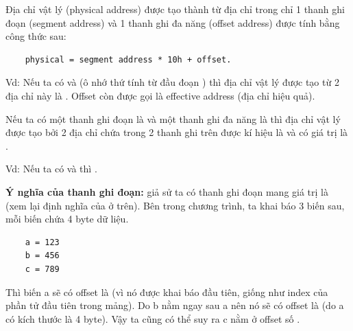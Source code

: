 \documentclass[main.tex]{subfiles}
\begin{document}
\begin{figure}[H]
    \centering
\end{figure}

Địa chỉ vật lý (physical address) được tạo thành từ địa chỉ trong chỉ 1 thanh ghi đoạn (segment address) và 1 thanh ghi đa năng (offset address) được tính bằng công thức sau:

\begin{center}
\begin{verbatim}
    physical = segment address * 10h + offset.
\end{verbatim}
\end{center}

Vd: Nếu ta có  và  (ô nhớ thứ  tính từ đầu đoạn ) thì địa chỉ vật lý được tạo từ 2 địa chỉ này là . Offset còn được gọi là effective address (địa chỉ hiệu quả).\bigskip

Nếu ta có một thanh ghi đoạn là  và một thanh ghi đa năng là  thì địa chỉ vật lý được tạo bởi 2 địa chỉ chứa trong 2 thanh ghi trên được kí hiệu là  và có giá trị là . 

Vd: Nếu ta có  và  thì .\bigskip

\textbf{Ý nghĩa của thanh ghi đoạn:} giả sử ta có thanh ghi đoạn  mang giá trị là  (xem lại định nghĩa của  ở trên). Bên trong chương trình, ta khai báo 3 biến sau, mỗi biến chứa 4 byte dữ liệu.
\begin{verbatim}
    a = 123
    b = 456
    c = 789
\end{verbatim}
Thì biến \cd a sẽ có offset là  (vì nó được khai báo đầu tiên, giống như index  của phần tử đầu tiên trong mảng). Do \cd b nằm ngay sau \cd a nên nó sẽ có offset là  (do \cd a có kích thước là 4 byte). Vậy ta cũng có thể suy ra \cd c nằm ở offset số .
\end{document}
